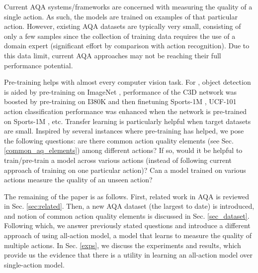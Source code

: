 \documentclass[10pt,twocolumn,letterpaper]{article}
\begin{document}
Current AQA systems/frameworks \cite{pirsia, parmar, venkat, doughty} are concerned with measuring the quality of a single action.  As such, the models are trained on examples of that particular action.  However, existing AQA datasets are typically very small, consisting of only a few samples since the collection of training data requires the use of a domain expert (significant effort by comparison with action recognition).  Due to this data limit, current AQA approaches may not be reaching their full performance potential.  

Pre-training helps with almost every computer vision task. For \eg, object detection \cite{girshick2016region} is aided by pre-training on ImageNet \cite{imagenet}, performance of the C3D network \cite{c3d} was boosted by pre-training on I380K \cite{c3d} and then finetuning Sports-1M \cite{sports1m}, UCF-101 \cite{ucf101} action classification performance was enhanced when the network is pre-trained on Sports-1M \cite{sports1m}, etc. Transfer learning is particularly helpful when target datasets are small. Inspired by several instances where pre-training has helped, we pose the following questions: are there common action quality elements (see Sec. \ref{common_aq_elements}) among different actions? If so, would it be helpful to train/pre-train a model across various actions (instead of following current approach of training on one particular action)? Can a model trained on various actions measure the quality of an unseen action? 

The remaining of the paper is as follows. First, related work in AQA is reviewed in Sec. \ref{sec:related}. Then, a new AQA dataset (the largest to date) is introduced, and notion of common action quality elements is discussed in Sec.  \ref{sec_dataset}. Following which, we answer previously stated questions and introduce a different approach of using all-action model, a model that learns to measure the quality of multiple actions. In Sec. \ref{exps}, we discuss the experiments and results, which provide us the evidence that there is a utility in learning an all-action model over single-action model.
\end{document}
